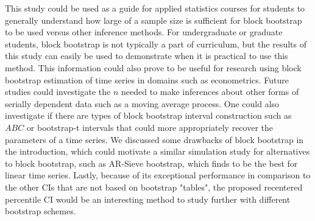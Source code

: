 \documentclass[10pt]{article}
\begin{document}
This study could be used as a guide for applied statistics courses for students
to generally understand how large of a sample size is sufficient for block
bootstrap to be used versus other inference methods. For undergraduate or 
graduate students, block bootstrap is not typically a part of curriculum, but
the results of this study can easily be used to demonstrate when it is practical 
to use this method. This information could also prove to be useful for research 
using block bootstrap estimation of time series in domains such as econometrics. 
Future studies could investigate the $n$ needed to make inferences about other 
forms of serially dependent data such as a moving average process. One could 
also investigate if there are types of block bootstrap interval construction 
such as $ABC$ or bootstrap-t intervals \citep{efron1993introduction} that could 
more
appropriately recover the parameters of a time series. We discussed some
drawbacks of block bootstrap in the introduction, which could motivate a similar
simulation study for alternatives to block bootstrap, such 
as AR-Sieve bootstrap, \citep{kreiss1992bootstrap} which 
\citet{buhlmann2002bootstraps} finds to be the best for linear time series. 
Lastly, because of its exceptional performance in comparison to the other 
CIs that are not based on bootstrap "tables", the proposed recentered percentile 
CI would be
an interesting method to study further with different bootstrap schemes.




 


\end{document}
